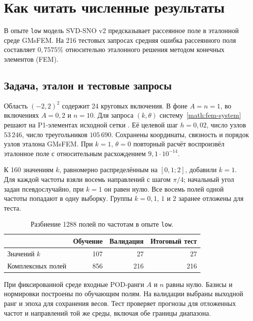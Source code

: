 \chapter{Как читать численные результаты}
\label{exp:chapter}

В опыте \texttt{low} модель SVD-SNO v2 предсказывает рассеянное
поле в эталонной среде GMsFEM. На 216 тестовых запросах средняя
ошибка рассеянного поля составляет $0{,}7575\%$ относительно
эталонного решения методом конечных элементов (FEM).

\section{Задача, эталон и тестовые запросы}

Область $(-2,2)^2$ содержит 24 круговых включения. В фоне $A=n=1$,
во включениях $A=0{,}2$ и $n=10$. Для запроса $(k,\theta)$
систему~\eqref{math:fem-system} решают на P1-элементах исходной сетки
. Её целевой шаг
$h=0{,}02$, число узлов $53\,246$, число треугольников $105\,690$.
Сохранены координаты, связность и порядок узлов эталона GMsFEM.
При $k=1$, $\theta=0$ повторный расчёт воспроизвёл эталонное поле
с относительным расхождением $9{,}1\cdot10^{-14}$.

К 160 значениям $k$, равномерно распределённым на $[0{,}1;2]$,
добавили $k=1$. Для каждой частоты взяли восемь направлений с шагом
$\pi/4$; начальный угол задан псевдослучайно, при $k=1$ он равен нулю.
Все восемь полей одной частоты попадают в одну выборку.
Группы $k=0{,}1$, $1$ и $2$ заранее отложены для теста.

\begin{table}[htbp]
\centering
\caption{Разбиение 1288 полей по частотам в опыте \texttt{low}.}
\label{exp:split}
\begin{tabular}{@{}lrrr@{}}
\toprule
 & Обучение & Валидация & Итоговый тест\\
\midrule
Значений $k$ & 107 & 27 & 27\\
Комплексных полей & 856 & 216 & 216\\
\bottomrule
\end{tabular}
\end{table}

При фиксированной среде входные POD-ранги $A$ и $n$ равны нулю.
Базисы и нормировки построены по обучающим полям. На валидации
выбраны выходной ранг и эпоха для сохранения весов. Тест проверяет
прогнозы для отложенных частот и направлений той же среды,
включая обе границы диапазона.

